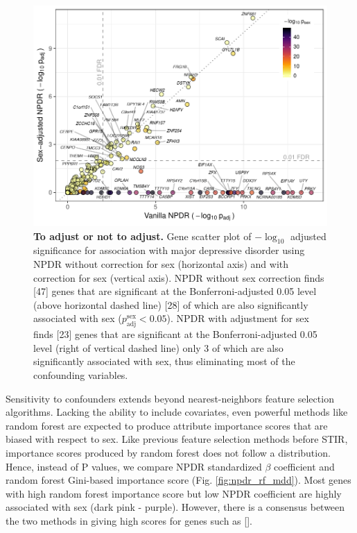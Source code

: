 \documentclass[10pt]{article}
\begin{document}
\begin{figure}[!tpb]%
\centerline{\includegraphics[]{../figs/npdrs_mdd.pdf}}
\caption{{\bf To adjust or not to adjust.}
Gene scatter plot of $-\log_{10}$ adjusted significance for association with major depressive disorder using NPDR without correction for sex (horizontal axis) and with correction for sex (vertical axis). NPDR without sex correction finds [47] genes that are significant at the Bonferroni-adjusted 0.05 level (above horizontal dashed line) [28] of which are also significantly associated with sex ($p^\textrm{sex}_\textrm{adj} < 0.05$).  NPDR with adjustment for sex finds [23] genes that are significant at the Bonferroni-adjusted 0.05 level (right of vertical dashed line) only 3 of which are also significantly associated with sex, thus eliminating most of the confounding variables.}
\label{fig:npdrs_mdd}
\end{figure}


Sensitivity to confounders extends beyond nearest-neighbors feature selection algorithms.
Lacking the ability to include covariates, even powerful methods like random forest are expected to produce attribute importance scores that are biased with respect to sex.
Like previous feature selection methods before STIR, importance scores produced by random forest does not follow a distribution.
Hence, instead of P values, we compare NPDR standardized $\beta$ coefficient and random forest Gini-based importance score (Fig. \ref{fig:npdr_rf_mdd}).
Most genes with high random forest importance score but low NPDR coefficient are highly associated with sex (dark pink - purple).
However, there is a consensus between the two methods in giving high scores for genes such as [].
\end{document}
